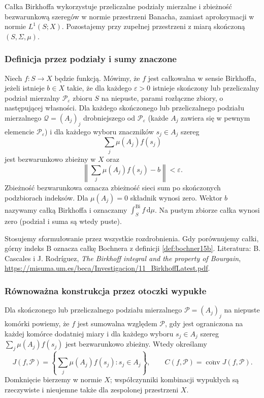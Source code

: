 Całka Birkhoffa wykorzystuje przeliczalne podziały mierzalne
i zbieżność bezwarunkową szeregów w normie przestrzeni Banacha,
zamiast aproksymacji w normie $L^1(S;X)$. Pozostajemy przy
zupełnej przestrzeni z miarą skończoną $(S,\Sigma,\mu)$.

\subsubsection{Definicja przez podziały i sumy znaczone}

\begin{definicja}
\label{def:birkhoff15b}
Niech $f:S\to X$ będzie funkcją. Mówimy, że $f$ jest
całkowalna w sensie Birkhoffa, jeżeli istnieje $b\in X$
takie, że dla każdego $\varepsilon>0$ istnieje skończony
lub przeliczalny podział mierzalny $\mathcal P_\varepsilon$
zbioru $S$ na niepuste, parami rozłączne zbiory, o następującej
własności. Dla każdego skończonego lub przeliczalnego podziału mierzalnego
$\mathcal Q=(A_j)_j$ drobniejszego od $\mathcal P_\varepsilon$
(każde $A_j$ zawiera się w pewnym elemencie $\mathcal P_\varepsilon$)
i dla każdego wyboru znaczników $s_j\in A_j$ szereg
\[
 \sum_j\mu(A_j)f(s_j)
\]
jest bezwarunkowo zbieżny w $X$ oraz
\[
 \left\|\sum_j\mu(A_j)f(s_j)-b\right\|<\varepsilon.
\]
Zbieżność bezwarunkowa oznacza zbieżność sieci sum po
skończonych podzbiorach indeksów. Dla $\mu(A_j)=0$
składnik wynosi zero. Wektor $b$ nazywamy całką Birkhoffa
i oznaczamy $\int_S^{\mathrm{Bi}}f\,\mathrm d\mu$.
Na pustym zbiorze całka wynosi zero
(podział i suma są wtedy puste).
\end{definicja}

Stosujemy sformułowanie przez wszystkie rozdrobnienia.
Gdy porównujemy całki, górny indeks $\mathrm B$ oznacza
całkę Bochnera z definicji \ref{def:bochner15b}.
Literatura: B. Cascales i J. Rodr\'iguez,
\emph{The Birkhoff integral and the property of Bourgain},
\url{https://misuma.um.es/beca/Investigacion/11_BirkhoffLatest.pdf}.

\subsubsection{Równoważna konstrukcja przez otoczki wypukłe}

\begin{definicja}
\label{def:birkhoff-sum-set15b}
Dla skończonego lub przeliczalnego podziału mierzalnego
$\mathcal P=(A_j)_j$ na niepuste komórki powiemy, że $f$ jest sumowalna
względem $\mathcal P$, gdy jest ograniczona na każdej
komórce dodatniej miary i dla każdego wyboru
$s_j\in A_j$ szereg $\sum_j\mu(A_j)f(s_j)$ jest
bezwarunkowo zbieżny. Wtedy określamy
\[
 J(f,\mathcal P)=
 \left\{\sum_j\mu(A_j)f(s_j):s_j\in A_j\right\},
 \qquad
 C(f,\mathcal P)=\overline{\operatorname{conv}}J(f,\mathcal P).
\]
Domknięcie bierzemy w normie $X$; współczynniki
kombinacji wypukłych są rzeczywiste i nieujemne
także dla zespolonej przestrzeni $X$.
\end{definicja}

